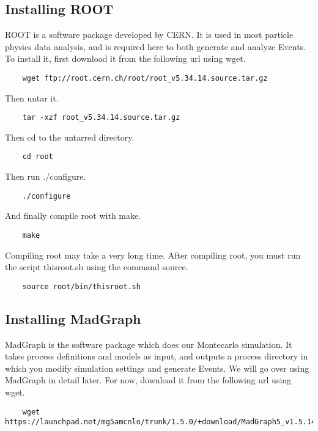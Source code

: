 \documentclass{article}
\begin{document}
\subsection{Installing ROOT}

ROOT is a software package developed by CERN. It is used in most particle physics data analysis, and is required here to both generate and analyze Events. To install it, first download it from the following url using wget.

\begin{verbatim}
	wget ftp://root.cern.ch/root/root_v5.34.14.source.tar.gz
\end{verbatim}

Then untar it.

\begin{verbatim}
	tar -xzf root_v5.34.14.source.tar.gz
\end{verbatim}

Then cd to the untarred directory.

\begin{verbatim}
	cd root
\end{verbatim}

Then run ./configure.

\begin{verbatim}
	./configure
\end{verbatim}

And finally compile root with make.

\begin{verbatim}
	make
\end{verbatim}

Compiling root may take a very long time. After compiling root, you must run the script thisroot.sh using the command source.

\begin{verbatim}
	source root/bin/thisroot.sh
\end{verbatim}

\subsection{Installing MadGraph}

MadGraph is the software package which does our Montecarlo simulation. It takes process definitions and models as input, and outputs a process directory in which you modify simulation settings and generate Events. We will go over using MadGraph in detail later. For now, download it from the following url using wget.

\begin{verbatim}
	wget https://launchpad.net/mg5amcnlo/trunk/1.5.0/+download/MadGraph5_v1.5.14.tar.gz
\end{verbatim}
\end{document}
